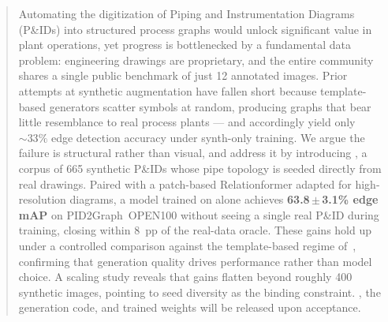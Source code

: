 \begin{abstract}
Automating the digitization of Piping and Instrumentation Diagrams
(P\&IDs) into structured process graphs would unlock significant value
in plant operations, yet progress is bottlenecked by a fundamental data
problem: engineering drawings are proprietary, and the entire community
shares a single public benchmark of just 12 annotated images.
Prior attempts at synthetic augmentation have fallen short because
template-based generators scatter symbols at random, producing graphs
that bear little resemblance to real process plants --- and accordingly
yield only ${\sim}33\%$ edge detection accuracy under synth-only training.
We argue the failure is structural rather than visual, and address it
by introducing \ours{}, a corpus of 665 synthetic P\&IDs whose pipe
topology is seeded directly from real drawings.
Paired with a patch-based Relationformer adapted for high-resolution
diagrams, a model trained on \ours{} alone achieves
\textbf{63.8\,$\pm$\,3.1\% edge mAP} on PID2Graph~OPEN100 without
seeing a single real P\&ID during training, closing within 8~pp of
the real-data oracle.
These gains hold up under a controlled comparison against the
template-based regime of~\cite{sturmer2025}, confirming that generation
quality drives performance rather than model choice.
A scaling study reveals that gains flatten beyond roughly 400 synthetic
images, pointing to seed diversity as the binding constraint.
\ours{}, the generation code, and trained weights will be released
upon acceptance.
\end{abstract}
